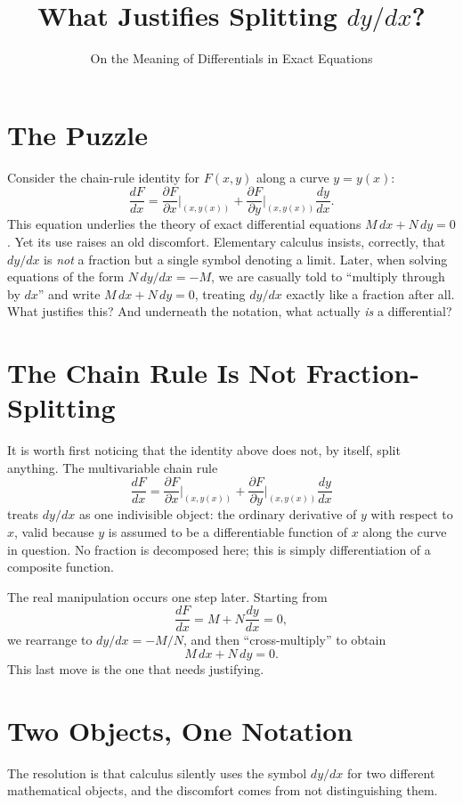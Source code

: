 \documentclass{essay}
\title{What Justifies Splitting \(dy/dx\)?}
\subtitle{On the Meaning of Differentials in Exact Equations}
\author{}
\date{}
\begin{document}
\maketitle

\section{The Puzzle}

Consider the chain-rule identity for \(F(x,y)\) along a curve \(y = y(x)\):
\[ \frac{dF}{dx} = \frac{\partial F}{\partial x}\bigg|_{(x,y(x))} + \frac{\partial F}{\partial y}\bigg|_{(x,y(x))}\frac{dy}{dx}. \]
This equation underlies the theory of exact differential equations \(M\,dx + N\,dy = 0\). Yet its use raises an old discomfort. Elementary calculus insists, correctly, that \(dy/dx\) is \emph{not} a fraction but a single symbol denoting a limit. Later, when solving equations of the form \(N\,dy/dx = -M\), we are casually told to ``multiply through by \(dx\)'' and write \(M\,dx + N\,dy = 0\), treating \(dy/dx\) exactly like a fraction after all. What justifies this? And underneath the notation, what actually \emph{is} a differential?

\section{The Chain Rule Is Not Fraction-Splitting}

It is worth first noticing that the identity above does not, by itself, split anything. The multivariable chain rule
\[ \frac{dF}{dx} = \frac{\partial F}{\partial x}\bigg|_{(x,y(x))} + \frac{\partial F}{\partial y}\bigg|_{(x,y(x))}\frac{dy}{dx} \]
treats \(dy/dx\) as one indivisible object: the ordinary derivative of \(y\) with respect to \(x\), valid because \(y\) is assumed to be a differentiable function of \(x\) along the curve in question. No fraction is decomposed here; this is simply differentiation of a composite function.

The real manipulation occurs one step later. Starting from
\[ \frac{dF}{dx} = M + N\frac{dy}{dx} = 0, \]
we rearrange to \(dy/dx = -M/N\), and then ``cross-multiply'' to obtain
\[ M\,dx + N\,dy = 0. \]
This last move is the one that needs justifying.

\section{Two Objects, One Notation}

The resolution is that calculus silently uses the symbol \(dy/dx\) for two different mathematical objects, and the discomfort comes from not distinguishing them.
\end{document}

